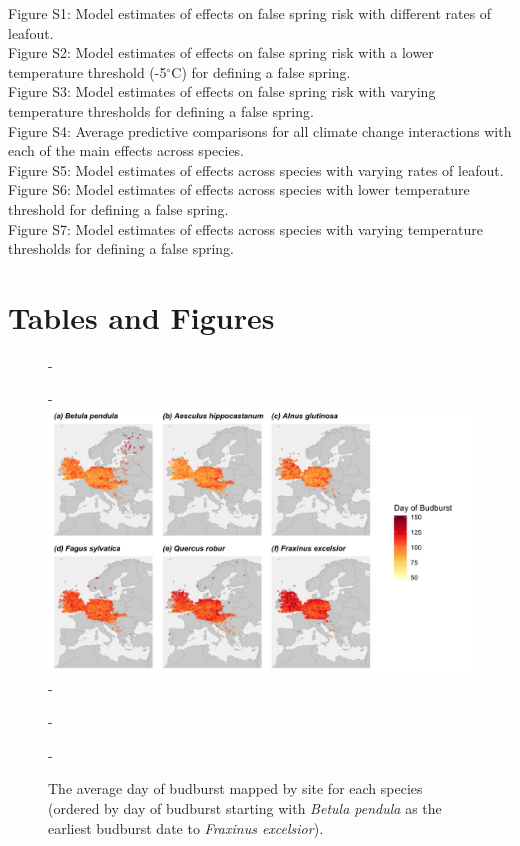 \documentclass{article}\usepackage[]{graphicx}\usepackage[]{color}
\begin{document}
\vspace{1ex}
Figure S1: Model estimates of effects on false spring risk with different rates of leafout. \\
Figure S2: Model estimates of effects on false spring risk with a lower temperature threshold (-5$^{\circ}$C) for defining a false spring. \\
Figure S3: Model estimates of effects on false spring risk with varying temperature thresholds for defining a false spring. \\
Figure S4:  Average predictive comparisons for all climate change interactions with each of the main effects across species. \\ 
Figure S5: Model estimates of effects across species with varying rates of leafout. \\
Figure S6: Model estimates of effects across species with lower temperature threshold for defining a false spring. \\
Figure S7: Model estimates of effects across species with varying temperature thresholds for defining a false spring. \\

\section*{Tables and Figures} 

{\begin{figure} [H]
  -\begin{center}
  -\includegraphics[width=14cm]{..//..//analyses/figures/bb_base.png}
  -\caption{The average day of budburst mapped by site for each species (ordered by day of budburst starting with \textit{Betula pendula} as the earliest budburst date to \textit{Fraxinus excelsior}). }\label{fig:bbmap}
  -\end{center}
  -\end{figure}}
  
\end{document}
